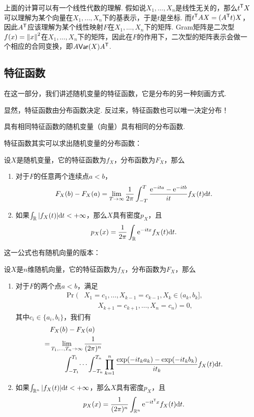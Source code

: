 上面的计算可以有一个线性代数的理解. 假如说$X_1,\dots,X_n$是线性无关的，那么$t^{\mathsf{T}} X$可以理解为某个向量在$X_1,\dots,X_n$下的基表示，于是$t$是坐标. 而$t^{\mathsf{T}} AX=(A^{\mathsf{T}} t)X$，因此$A^{\mathsf{T}}$应该理解为某个线性映射$F$在$X_1,\dots,X_n$下的矩阵. Gram矩阵是二次型$f(x)=\left\|x\right\|^2$在$X_1,\dots,X_n$下的矩阵，因此在$F$的作用下，二次型的矩阵表示会做一个相应的合同变换，即$A\mathsf{Var}(X)A^{\mathsf{T}}$.

\subsection{特征函数} \label{subsec:characteristic-function}

在这一部分，我们讲述随机变量的特征函数，它是分布的另一种刻画方式. 

显然，特征函数由分布函数决定. 反过来，特征函数也可以唯一决定分布！

\begin{theorem}\label{proposition:characteristic-function-uniqueness}
具有相同特征函数的随机变量（向量）具有相同的分布函数.
\end{theorem}

特征函数其实可以求出随机变量的分布函数：
\begin{theorem}[逆转公式]\label{proposition:characteristic-function}
设$X$是随机变量，它的特征函数为$f_X$，分布函数为$F_X$，那么
\begin{enumerate}
    \item 对于$F$的任意两个连续点$a<b$，
    \[F_X(b)-F_X(a)=\lim_{T\to\infty}\frac{1}{2\pi}\int_{-T}^T\frac{\mathrm{e}^{-ita}-\mathrm{e}^{-itb}}{it}f_X(t)\mathrm{d} t.\]
    \item 如果$\int_{\mathbb{R}}|f_X(t)|\mathrm{d} t<+\infty$，那么$X$具有密度$p_X$，且
    \[p_X(x)=\frac{1}{2\pi}\int_{\mathbb{R}}\mathrm{e}^{-itx}f_X(t)\mathrm{d} t.\]
\end{enumerate}
\end{theorem}

这一公式也有随机向量的版本：

\begin{theorem}\label{proposition:characteristic-function-vector}
设$X$是$n$维随机向量，它的特征函数为$f_X$，分布函数为$F_X$，那么
\begin{enumerate}
    \item 对于$F$的两个点$a<b$，满足
    \begin{align*}
        \Pr(&X_1=c_1,\dots,X_{k-1}=c_{k-1},X_k\in(a_k,b_k],\\
        &\qquad X_{k+1}=c_{k+1},\dots,X_n=c_n)=0,
    \end{align*}
    其中$c_i\in\{a_i,b_i\}$，我们有
    \begin{align*}
        &F_X(b)-F_X(a)\\
        =&\lim_{T_1,\dots,T_n\to\infty}\frac{1}{(2\pi)^n}\\
        &\qquad\int_{-T_1}^{T_1}\dots\int_{-T_n}^{T_n}\prod_{k=1}^n\frac{\exp(-it_ka_k)-\exp(-it_kb_k)}{it_k}f_X(t)\mathrm{d} t.
    \end{align*}
    \item 如果$\int_{\mathbb{R}^n}|f_X(t)|\mathrm{d} t<+\infty$，那么$X$具有密度$p_X$，且
    \[p_X(x)=\frac{1}{(2\pi)^n}\int_{\mathbb{R}^n}\mathrm{e}^{-it^{\mathsf{T}} x}f_X(t)\mathrm{d} t.\]
\end{enumerate}
\end{theorem}

